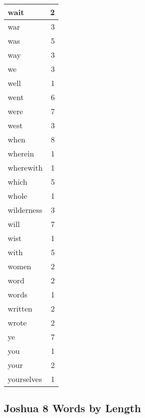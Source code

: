 \begin{center}
\begin{longtable}{l|r}
wait & 2\\ \hline 
war & 3\\ \hline 
was & 5\\ \hline 
way & 3\\ \hline 
we & 3\\ \hline 
well & 1\\ \hline 
went & 6\\ \hline 
were & 7\\ \hline 
west & 3\\ \hline 
when & 8\\ \hline 
wherein & 1\\ \hline 
wherewith & 1\\ \hline 
which & 5\\ \hline 
whole & 1\\ \hline 
wilderness & 3\\ \hline 
will & 7\\ \hline 
wist & 1\\ \hline 
with & 5\\ \hline 
women & 2\\ \hline 
word & 2\\ \hline 
words & 1\\ \hline 
written & 2\\ \hline 
wrote & 2\\ \hline 
ye & 7\\ \hline 
you & 1\\ \hline 
your & 2\\ \hline 
yourselves & 1\\ \hline 
\end{longtable}
\end{center}





\subsection{Joshua 8 Words by Length}


\normalsize
 
